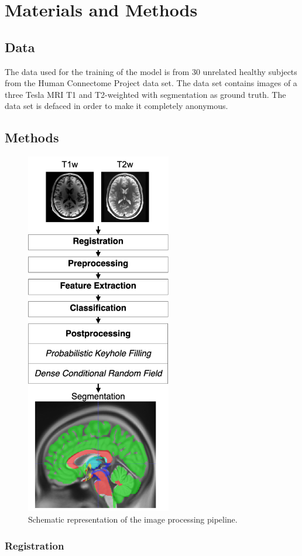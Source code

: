 \documentclass[journal]{IEEEtran}
\begin{document}
\section{Materials and Methods}
\subsection{Data}
The data used for the training of the model is from 30 unrelated healthy subjects from the Human Connectome Project data set. The data set contains images of a three Tesla MRI T1 and T2-weighted with segmentation as ground truth. The data set is defaced in order to make it  completely anonymous.
\subsection{Methods}
\begin{figure}[h!]
\centering
\includegraphics[width=2.5in]{img/pipeline}
\caption{Schematic representation of the image processing pipeline.}
\label{fig_pipeline}
\end{figure}


\subsubsection{Registration}
\end{document}
